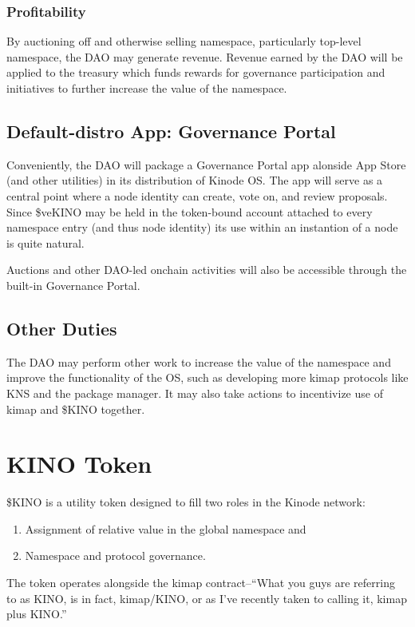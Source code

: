 \documentclass[runningheads]{llncs}
\begin{document}
\subsubsection{Profitability}
\label{sec:daoprofit}

By auctioning off and otherwise selling namespace, particularly top-level namespace, the DAO may generate revenue.
Revenue earned by the DAO will be applied to the treasury which funds rewards for governance participation and initiatives to further increase the value of the namespace.

\subsection{Default-distro App: Governance Portal}
\label{sec:daoportal}

Conveniently, the DAO will package a Governance Portal app alonside App Store (and other utilities) in its distribution of Kinode OS.
The app will serve as a central point where a node identity can create, vote on, and review proposals.
Since \$veKINO may be held in the token-bound account attached to every namespace entry (and thus node identity) its use within an instantion of a node is quite natural.

Auctions and other DAO-led onchain activities will also be accessible through the built-in Governance Portal.

\subsection{Other Duties}
\label{sec:daoduties}

The DAO may perform other work to increase the value of the namespace and improve the functionality of the OS, such as developing more kimap protocols like KNS and the package manager.
It may also take actions to incentivize use of kimap and \$KINO together.

\section{KINO Token}
\label{sec:kino}

\$KINO is a utility token designed to fill two roles in the Kinode network:
\begin{enumerate}
\item Assignment of relative value in the global namespace and
\item Namespace and protocol governance.
\end{enumerate}
The token operates alongside the kimap contract–``What you guys are referring to as KINO, is in fact, kimap/KINO, or as I've recently taken to calling it, kimap plus KINO.''%
\end{document}

